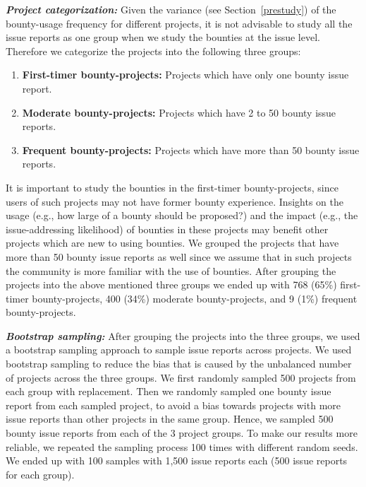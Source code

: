 \noindent\emph{\textbf{Project categorization:}} Given the variance (see Section~\ref{prestudy}) of the bounty-usage frequency for different projects, it is not advisable to study all the issue reports as one group when we study the bounties at the issue level. Therefore we categorize the projects into the following three groups:

\begin{enumerate}
    \item \textbf{First-timer bounty-projects:} Projects which have only one bounty issue report.
    \item \textbf{Moderate bounty-projects:} Projects which have 2 to 50 bounty issue reports.
    \item \textbf{Frequent bounty-projects:} Projects which have more than 50 bounty issue reports.
\vspace{-0.01in}
\end{enumerate}

It is important to study the bounties in the first-timer bounty-projects, since users of such projects may not have former bounty experience. Insights on the usage (e.g., how large of a bounty should be proposed?) and the impact (e.g., the issue-addressing likelihood) of bounties in these projects may benefit other projects which are new to using bounties. We grouped the projects that have more than 50 bounty issue reports as well since we assume that in such projects the community is more familiar with the use of bounties.
After grouping the projects into the above mentioned three groups we ended up with 768 (65\%) first-timer bounty-projects, 400 (34\%) moderate bounty-projects, and 9 (1\%) frequent bounty-projects. %


\noindent\emph{\textbf{Bootstrap sampling:}} After grouping the projects into the three groups, we used a bootstrap sampling approach to sample issue reports across projects. We used bootstrap sampling to reduce the bias that is caused by the unbalanced number of projects across the three groups. We first randomly sampled 500 projects from each group with replacement. Then we randomly sampled one bounty issue report from each sampled project, to avoid a bias towards projects with more issue reports than other projects in the same group. Hence, we sampled 500 bounty issue reports from each of the 3 project groups. To make our results more reliable, we repeated the sampling process 100 times with different random seeds. We ended up with 100 samples with 1,500 issue reports each (500 issue reports for each group).


